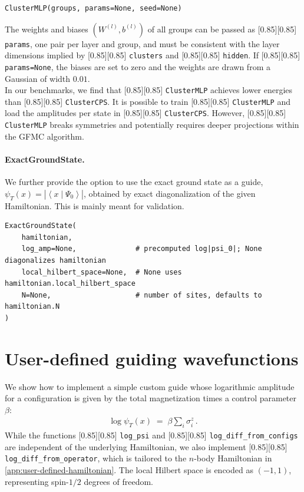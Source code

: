 \documentclass{SciPost}
\newcommand{\pyinline}[1]{\begingroup\setlength{\fboxsep}{0pt}%
  \colorbox{gray!15}{\raisebox{0pt}[0.85\ht\strutbox][0.85\dp\strutbox]{%
    \hspace{1pt}\lstinline{#1}\hspace{1pt}}}\endgroup}
\providecommand{\braket}[2]{\left\langle#1\middle|#2\right\rangle}
\begin{document}
\begin{lstlisting}
ClusterMLP(groups, params=None, seed=None)
\end{lstlisting}

The weights and biases $(W^{(l)}, b^{(l)})$ of all groups can be passed as \pyinline{params}, one pair per layer and group, and must be consistent with the layer dimensions implied by \pyinline{clusters} and \pyinline{hidden}.
%
If \pyinline{params=None}, the biases are set to zero and the weights are drawn from a Gaussian of width $0.01$.\\

In our benchmarks, we find that \pyinline{ClusterMLP} achieves lower energies than \pyinline{ClusterCPS}.
%
It is possible to train \pyinline{ClusterMLP} and load the amplitudes per state in \pyinline{ClusterCPS}.
%
However, \pyinline{ClusterMLP} breaks symmetries and potentially requires deeper projections within the GFMC algorithm.


\paragraph{ExactGroundState.}
We further provide the option to use the exact ground state as a guide, $\psi_T(x) = |\braket{x}{\Psi_0}|$, obtained by exact diagonalization of the given Hamiltonian.
%
This is mainly meant for validation.\\

\begin{lstlisting}
ExactGroundState(
    hamiltonian,
    log_amp=None,              # precomputed log|psi_0|; None diagonalizes hamiltonian 
    local_hilbert_space=None,  # None uses hamiltonian.local_hilbert_space
    N=None,                    # number of sites, defaults to hamiltonian.N
)
\end{lstlisting}


\section{User-defined guiding wavefunctions}\label{app:user-defined-guides}
We show how to implement a simple custom guide whose logarithmic amplitude for a configuration is given by the total magnetization times a control parameter $\beta$:
\begin{align}
	\log\psi_T(x) \;=\; \beta \sum_i \sigma^z_i\,.
	\label{eq:phi_custom_guide}
\end{align}
While the functions \pyinline{log_psi} and \pyinline{log_diff_from_configs} are independent of the underlying Hamiltonian, we also implement \pyinline{log_diff_from_operator}, which is tailored to the $n$-body Hamiltonian in \autoref{app:user-defined-hamiltonian}.
%
The local Hilbert space is encoded as $(-1,1)$, representing spin-$1/2$ degrees of freedom.
\end{document}
